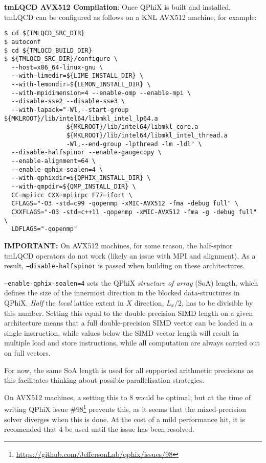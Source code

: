 \textbf{tmLQCD AVX512 Compilation}: Once QPhiX is built and installed, tmLQCD can be configured as follows on a KNL AVX512 machine, for example:
\begin{framed}
\begin{Verbatim}[fontsize=\small]
$ cd ${TMLQCD_SRC_DIR}
$ autoconf
$ cd ${TMLQCD_BUILD_DIR}
$ ${TMLQCD_SRC_DIR}/configure \
  --host=x86_64-linux-gnu \
  --with-limedir=${LIME_INSTALL_DIR} \
  --with-lemondir=${LEMON_INSTALL_DIR} \
  --with-mpidimension=4 --enable-omp --enable-mpi \
  --disable-sse2 --disable-sse3 \
  --with-lapack="-Wl,--start-group ${MKLROOT}/lib/intel64/libmkl_intel_lp64.a
                 ${MKLROOT}/lib/intel64/libmkl_core.a
                 ${MKLROOT}/lib/intel64/libmkl_intel_thread.a
                 -Wl,--end-group -lpthread -lm -ldl" \
  --disable-halfspinor --enable-gaugecopy \
  --enable-alignment=64 \
  --enable-qphix-soalen=4 \
  --with-qphixdir=${QPHIX_INSTALL_DIR} \
  --with-qmpdir=${QMP_INSTALL_DIR} \
  CC=mpiicc CXX=mpiicpc F77=ifort \
  CFLAGS="-O3 -std=c99 -qopenmp -xMIC-AVX512 -fma -debug full" \
  CXXFLAGS="-O3 -std=c++11 -qopenmp -xMIC-AVX512 -fma -g -debug full" \
  LDFLAGS="-qopenmp"
\end{Verbatim}
\end{framed}
\textbf{IMPORTANT:} On AVX512 machines, for some reason, the half-spinor tmLQCD operators do not work (likely an issue with MPI and alignment).
As a result, \texttt{--disable-halfspinor} is passed when building on these architectures.

\texttt{--enable-qphix-soalen=4} sets the QPhiX \emph{structure of array} (SoA) length, which defines the size of the innermost direction in the blocked data-structures in QPhiX.
\emph{Half} the \emph{local} lattice extent in $X$ direction, $L_x/2$, has to be divisible by this number.
Setting this equal to the double-precision SIMD length on a given architecture means that a full double-precision SIMD vector can be loaded in a single instruction, while values below the SIMD vector length will result in multiple load and store instructions, while all computation are always carried out on full vectors.

For now, the same SoA length is used for all supported arithmetic precisions as this facilitates thinking about possible parallelisation strategies.

On AVX512 machines, a setting this to $8$ would be optimal, but at the time of writing QPhiX issue \#$98$\footnote{\url{https://github.com/JeffersonLab/qphix/issues/98}} prevents this, as it seems that the mixed-precision solver diverges when this is done.
At the cost of a mild performance hit, it is recomended that $4$ be used until the issue has been resolved.

